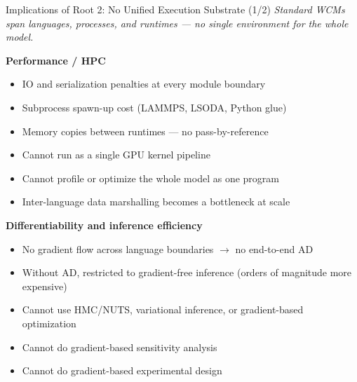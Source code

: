 \documentclass[aspectratio=169]{beamer}
\begin{document}
\begin{frame}[noframenumbering]{Implications of Root 2: No Unified Execution Substrate (1/2)}
	\footnotesize
	\textit{Standard WCMs span languages, processes, and runtimes --- no single environment for the whole model.}

	\smallskip
	\textbf{Performance / HPC}
	\begin{itemize}\itemsep0pt\parskip0pt
		\item IO and serialization penalties at every module boundary
		\item Subprocess spawn-up cost (LAMMPS, LSODA, Python glue)
		\item Memory copies between runtimes --- no pass-by-reference
		\item Cannot run as a single GPU kernel pipeline
		\item Cannot profile or optimize the whole model as one program
		\item Inter-language data marshalling becomes a bottleneck at scale
	\end{itemize}

	\smallskip
	\textbf{Differentiability and inference efficiency}
	\begin{itemize}\itemsep0pt\parskip0pt
		\item No gradient flow across language boundaries $\to$ no end-to-end AD
		\item Without AD, restricted to gradient-free inference (orders of magnitude more expensive)
		\item Cannot use HMC/NUTS, variational inference, or gradient-based optimization
		\item Cannot do gradient-based sensitivity analysis
		\item Cannot do gradient-based experimental design
	\end{itemize}
\end{frame}
\end{document}
